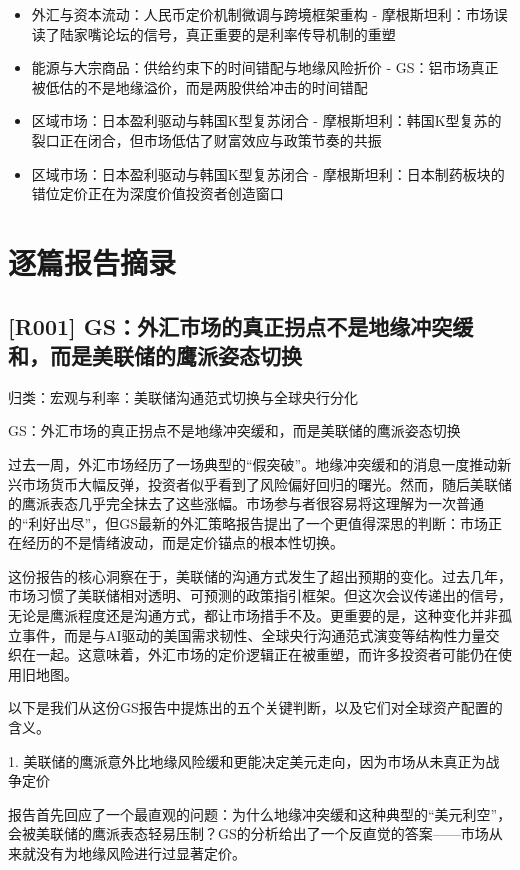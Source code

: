 \documentclass[11pt]{ctexart}
\begin{document}
\begin{itemize}
  \item [R032] 外汇与资本流动：人民币定价机制微调与跨境框架重构 - 摩根斯坦利：市场误读了陆家嘴论坛的信号，真正重要的是利率传导机制的重塑
  \item [R033] 能源与大宗商品：供给约束下的时间错配与地缘风险折价 - GS：铝市场真正被低估的不是地缘溢价，而是两股供给冲击的时间错配
  \item [R034] 区域市场：日本盈利驱动与韩国K型复苏闭合 - 摩根斯坦利：韩国K型复苏的裂口正在闭合，但市场低估了财富效应与政策节奏的共振
  \item [R035] 区域市场：日本盈利驱动与韩国K型复苏闭合 - 摩根斯坦利：日本制药板块的错位定价正在为深度价值投资者创造窗口
\end{itemize}
\section{逐篇报告摘录}
\subsection{[R001] GS：外汇市场的真正拐点不是地缘冲突缓和，而是美联储的鹰派姿态切换}
{\small\color{refgray}归类：宏观与利率：美联储沟通范式切换与全球央行分化}

GS：外汇市场的真正拐点不是地缘冲突缓和，而是美联储的鹰派姿态切换

过去一周，外汇市场经历了一场典型的“假突破”。地缘冲突缓和的消息一度推动新兴市场货币大幅反弹，投资者似乎看到了风险偏好回归的曙光。然而，随后美联储的鹰派表态几乎完全抹去了这些涨幅。市场参与者很容易将这理解为一次普通的“利好出尽”，但GS最新的外汇策略报告提出了一个更值得深思的判断：市场正在经历的不是情绪波动，而是定价锚点的根本性切换。

这份报告的核心洞察在于，美联储的沟通方式发生了超出预期的变化。过去几年，市场习惯了美联储相对透明、可预测的政策指引框架。但这次会议传递出的信号，无论是鹰派程度还是沟通方式，都让市场措手不及。更重要的是，这种变化并非孤立事件，而是与AI驱动的美国需求韧性、全球央行沟通范式演变等结构性力量交织在一起。这意味着，外汇市场的定价逻辑正在被重塑，而许多投资者可能仍在使用旧地图。

以下是我们从这份GS报告中提炼出的五个关键判断，以及它们对全球资产配置的含义。

1. 美联储的鹰派意外比地缘风险缓和更能决定美元走向，因为市场从未真正为战争定价

报告首先回应了一个最直观的问题：为什么地缘冲突缓和这种典型的“美元利空”，会被美联储的鹰派表态轻易压制？GS的分析给出了一个反直觉的答案——市场从来就没有为地缘风险进行过显著定价。
\end{document}
